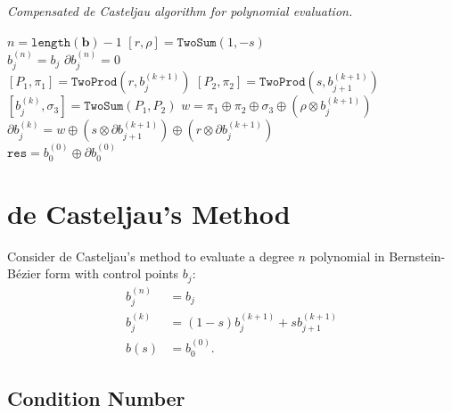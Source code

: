 \documentclass[letterpaper,10pt]{article}
\begin{document}
\begin{algorithm}[H]
  \caption{\textit{Compensated de Casteljau algorithm for polynomial evaluation.}}

  \begin{algorithmic}
      \State \(n = \texttt{length}(\mathbf{b}) - 1\)
      \State \(\left[r, \rho\right] = \mathtt{TwoSum}(1, -s)\)
      \\
        \State \(b_j^{(n)} = b_j\)
        \State \(\partial b_j^{(n)} = 0\)
      \EndFor
      \\
          \State \(\left[P_1, \pi_1\right] = \mathtt{TwoProd}\left(
              r, b_j^{(k + 1)}\right)\)
          \State \(\left[P_2, \pi_2\right] = \mathtt{TwoProd}\left(
              s, b_{j + 1}^{(k + 1)}\right)\)
          \State \(\left[b_j^{(k)}, \sigma_3\right] = \mathtt{TwoSum}(
              P_1, P_2)\)
          \State \(w = \pi_1 \oplus \pi_2 \oplus \sigma_3 \oplus
              \left(\rho \otimes b_j^{(k + 1)}\right)\)
          \State \(\partial b_j^{(k)} = w \oplus \left(s \otimes
              \partial b_{j + 1}^{(k + 1)}
              \right) \oplus \left(r \otimes \partial b_j^{(k + 1)}\right)\)
        \EndFor
      \EndFor
      \\
      \State \(\mathtt{res} = b_0^{(0)} \oplus \partial b_0^{(0)}\)
    \EndFunction
  \end{algorithmic}
\end{algorithm}

\section{de Casteljau's Method}

Consider de Casteljau's method to evaluate a degree \(n\)
polynomial in Bernstein-B\'{e}zier form with control points \(b_j\):
\begin{align*}
    b_j^{(n)} &= b_j \\
    b_j^{(k)} &= (1 - s) b_j^{(k + 1)} + s b_{j + 1}^{(k + 1)} \\
    b(s) &= b_0^{(0)}.
\end{align*}

\subsection{Condition Number}
\end{document}
